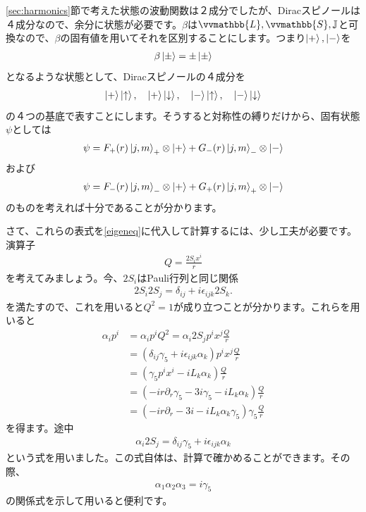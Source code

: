 \documentclass[report,paper=a4, fontsize=12pt, line_length=16cm, number_of_lines=33,dvipdfmx]{jlreq}
\numberwithin{equation}{chapter}
\newcommand{\del}{\partial}
\newcommand{\Lb}{\vvmathbb{L}}
\newcommand{\Sb}{\vvmathbb{S}}
\newcommand{\Jb}{\mathbb{J}}
\newcommand{\uket}{\ket{\uparrow}}
\newcommand{\dket}{\ket{\downarrow}}
\begin{document}
\ref{sec:harmonics}節で考えた状態の波動関数は２成分でしたが、Diracスピノールは４成分なので、余分に状態が必要です。$\beta$は$\Lb,\Sb,\Jb$と可換なので、$\beta$の固有値を用いてそれを区別することにします。つまり$\ket{+},\ket{-}$を
\begin{align*}
  \beta\ket{\pm}=\pm\ket{\pm}
\end{align*}
となるような状態として、Diracスピノールの４成分を
\begin{align*}
  \ket{+}\uket,\quad
  \ket{+}\dket,\quad
  \ket{-}\uket,\quad
  \ket{-}\dket
\end{align*}
の４つの基底で表すことにします。そうすると対称性の縛りだけから、固有状態$\psi$としては
\begin{align}
  \psi=
  F_{+}(r)\ket{j,m}_{+}\otimes\ket{+}
  +G_{-}(r)\ket{j,m}_{-}\otimes\ket{-}\label{ansatzp}
\end{align}
および
\begin{align}
  \psi=
  F_{-}(r)\ket{j,m}_{-}\otimes\ket{+}
  +G_{+}(r)\ket{j,m}_{+}\otimes\ket{-}\label{ansatzm}
\end{align}
のものを考えれば十分であることが分かります。

さて、これらの表式を\eqref{eigeneq}に代入して計算するには、少し工夫が必要です。演算子
\begin{align}
  Q=\frac{2S_i x^{i}}{r}
\end{align}
を考えてみましょう。今、$2S_i$はPauli行列と同じ関係
\begin{align}
  2S_i2S_j=\delta_{ij}+i\epsilon_{ijk}2S_{k}.
\end{align}
を満たすので、これを用いると$Q^2=1$が成り立つことが分かります。これらを用いると
\begin{align}
  \alpha_ip^i&=\alpha_i p^i Q^2=\alpha_i 2S_j p^{i}x^{j} \frac{Q}{r}\nonumber\\
  &=(\delta_{ij}\gamma_{5}+i\epsilon_{ijk}\alpha_{k})p^{i}x^{j}\frac{Q}{r}\nonumber\\
  &=(\gamma_{5}p^{i}x^{i}-iL_k\alpha_{k})\frac{Q}{r}\nonumber\\
  &=(-ir\del_{r}\gamma_{5}-3i\gamma_5-iL_k\alpha_{k})\frac{Q}{r}\nonumber\\
  &=(-ir\del_{r}-3i-iL_k\alpha_{k}\gamma_5)\gamma_5\frac{Q}{r}\label{alphap}
\end{align}
を得ます。途中
\begin{align}
  \alpha_{i}2S_{j}=\delta_{ij}\gamma_{5}+i\epsilon_{ijk}\alpha_{k}
\end{align}
という式を用いました。この式自体は、計算で確かめることができます。その際、
\begin{align*}
  \alpha_{1}\alpha_{2}\alpha_{3}=i\gamma_5
\end{align*}
の関係式を示して用いると便利です。
\end{document}
